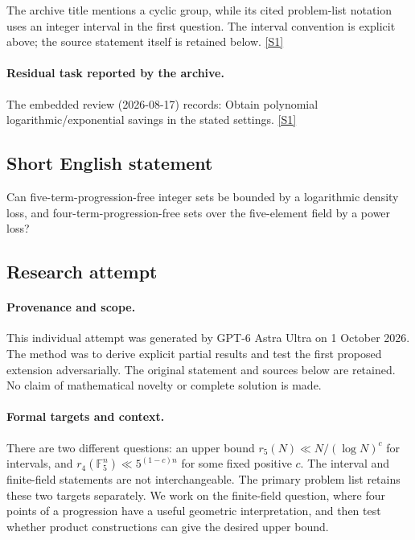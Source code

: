 \documentclass[11pt,a4paper]{article}
\newcommand{\F}{\mathbb{F}}
\newcommand{\sref}[2]{\hyperlink{source:#1:#2}{[S#2]}}
\begin{document}
The archive title mentions a cyclic group, while its cited problem-list notation uses an integer interval in the first question. The interval convention is explicit above; the source statement itself is retained below. \sref{statement}{1}

\paragraph{Residual task reported by the archive.}

The embedded review (2026-08-17) records: Obtain polynomial logarithmic/exponential savings in the stated settings. \sref{statement}{1}

\subsection{Short English statement}

Can five-term-progression-free integer sets be bounded by a logarithmic density loss, and four-term-progression-free sets over the five-element field by a power loss?

\subsection{Research attempt}

\paragraph{Provenance and scope.}
This individual attempt was generated by GPT-6 Astra Ultra on 1 October 2026. The method was to derive explicit partial results and test the first proposed extension adversarially. The original statement and sources below are retained. No claim of mathematical novelty or complete solution is made.

\paragraph{Formal targets and context.}
There are two different questions: an upper bound $r_5(N)\ll N/(\log N)^c$ for intervals, and $r_4(\F_5^n)\ll5^{(1-c)n}$ for some fixed positive $c$. The interval and finite-field statements are not interchangeable. The primary problem list retains these two targets separately. We work on the finite-field question, where four points of a progression have a useful geometric interpretation, and then test whether product constructions can give the desired upper bound.
\end{document}
